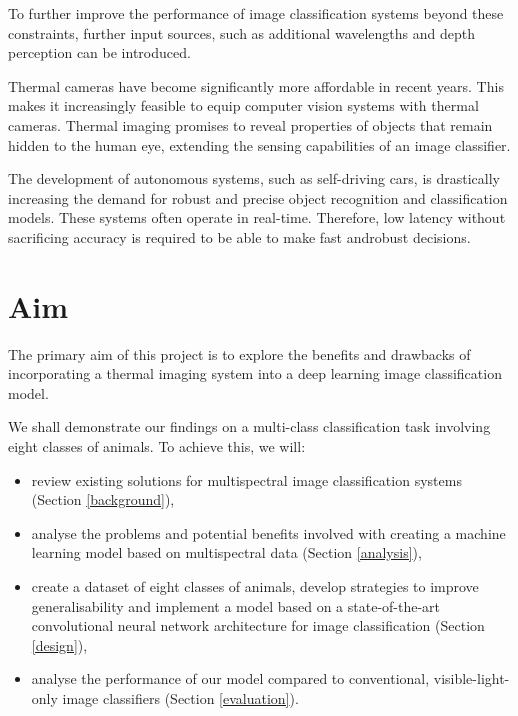 \documentclass{l4proj}
\begin{document}
To further improve the performance of image classification systems beyond these constraints, further input sources, such as additional wavelengths and depth perception can be introduced.

Thermal cameras have become significantly more affordable in recent years. This makes it increasingly feasible to equip computer vision systems with thermal cameras. Thermal imaging promises to reveal properties of objects that remain hidden to the human eye, extending the sensing capabilities of an image classifier.

The development of autonomous systems, such as self-driving cars, is drastically increasing the demand for robust and precise object recognition and classification models. These systems often operate in real-time. Therefore, low latency without sacrificing accuracy is required to be able to make fast androbust decisions.


\section{Aim}

The primary aim of this project is to explore the benefits and drawbacks of incorporating a thermal imaging system into a deep learning image classification model.

We shall demonstrate our findings on a multi-class classification task involving eight classes of animals. To achieve this, we will:

\begin{itemize}
  \item review existing solutions for multispectral image classification systems (Section \ref{background}),
  \item analyse the problems and potential benefits involved with creating a machine learning model based on multispectral data (Section \ref{analysis}),
  \item create a dataset of eight classes of animals, develop strategies to improve generalisability and implement a model based on a state-of-the-art convolutional neural network architecture for image classification (Section \ref{design}),
  \item analyse the performance of our model compared to conventional, visible-light-only image classifiers (Section \ref{evaluation}).
\end{itemize}
\end{document}
